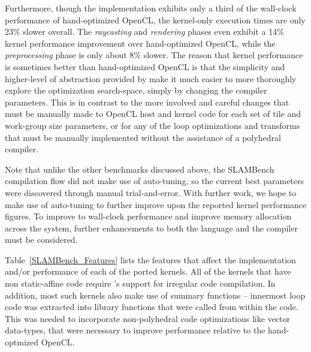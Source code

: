\documentclass{llncs}
\begin{document}
Furthermore, though the \pencil implementation exhibits only a third
of the wall-clock performance of hand-optimized OpenCL, the kernel-only
execution times are only 23\% slower overall. The \textit{raycasting} and
\textit{rendering} phases even exhibit a 14\% kernel performance improvement
over hand-optimized OpenCL, while the \textit{preprocessing} phase is only
about 8\% slower.
The reason that kernel performance is sometimes better than hand-optimized
OpenCL is that the simplicity and higher-level of abstraction provided by
\pencil make it much easier to more thoroughly explore the optimization
search-space, simply by changing the \PPCG compiler parameters.
This is in contrast to the more involved and careful changes that must
be manually made to OpenCL host and kernel code for each set of tile
and work-group size parameters, or for any of the loop optimizations
and transforms that must be manually implemented without the assistance
of a polyhedral compiler.

Note that unlike the other benchmarks discussed above, the SLAMBench
\pencil compilation flow did not make use of auto-tuning, so the current
best \PPCG parameters were discovered through manual trial-and-error.
With further work, we hope to make use of auto-tuning to further improve
upon the reported kernel performance figures. To improve to wall-clock
performance and improve memory allocation across the system, further
enhancements to both the \pencil language and the \PPCG compiler must
be considered.

Table~\ref{SLAMBench_Features} lists the \pencil features that affect
the implementation and/or performance of each of the ported kernels.
All of the kernels that have non static-affine code require \PPCG's
support for irregular code compilation.
In addition, most such kernels also make use of summary
functions -- innermost loop code was extracted into library functions
that were called from within the \pencil code.
This was needed to incorporate non-polyhedral code optimizations like
vector data-types, that were necessary to improve performance relative
to the hand-optmized OpenCL.

\end{document}
